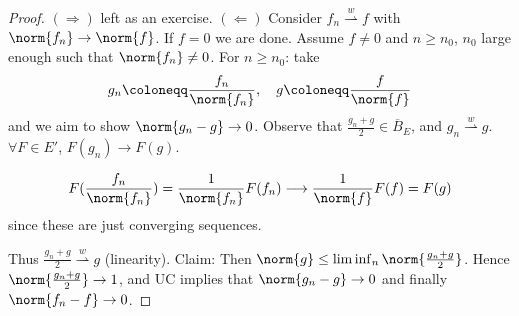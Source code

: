 \documentclass[twoside]{article}
\newcommand{\weakconv}{\overset{w}{\rightharpoonup}}
\begin{document}
\begin{proof}
    $(\Rightarrow)$ left as an exercise.
    $(\Leftarrow)$ Consider $f_n \weakconv f$ with $\norm{f_n} \to \norm{f}$. If $f = 0$ we are done. Assume $f \neq 0$ and $ n \geq n_0$, $n_0$ large enough such that $\norm{f_n} \neq 0$.
    For $n \geq n_0$: take
    \begin{equation*}
        g_n \coloneqq \frac{f_n}{\norm{f_n}}, \quad g \coloneqq \frac{f}{\norm{f}}
    \end{equation*}
    and we aim to show $\norm{g_n - g} \to 0$.
    Observe that $\frac{g_n + g}{2} \in \overline{B}_E$, and $g_n \weakconv g$. $\forall F \in E'$, $F(g_n) \to F(g)$.

    \begin{equation*}
        F(\frac{f_n}{\norm{f_n}}) = \frac{1}{\norm{f_n}} F(f_n) \longrightarrow \frac{1}{\norm{f}} F(f) = F(g)
    \end{equation*}
    since these are just converging sequences.

    Thus $\frac{g_n + g}{2} \weakconv g$ (linearity).
    Claim: Then $\norm{g} \leq \liminf_{n} \norm{\frac{g_n + g}{2}}$.
    Hence $\norm{\frac{g_n+g}{2}} \to 1$, and UC implies that $\norm{g_n - g} \to 0$ and finally $\norm{f_n - f} \to 0$.
\end{proof}
\end{document}
